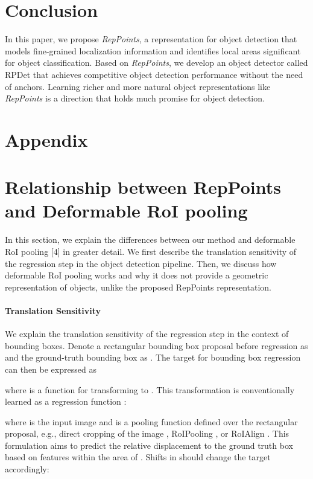 \documentclass[10pt,twocolumn,letterpaper]{article}
\begin{document}
 \vspace{-.5em}
\section{Conclusion}
In this paper, we propose \textit{RepPoints}, a representation for object detection that models fine-grained localization information and identifies local areas significant for object classification. Based on \textit{RepPoints}, we develop an object detector called RPDet that achieves competitive object detection performance without the need of anchors. Learning richer and more natural object representations like \textit{RepPoints} is a direction that holds much promise for object detection.
 
{\small


}
\clearpage
\section*{Appendix}
\appendix
\renewcommand{\thesection}{A\arabic{section}}  

\section{Relationship between RepPoints and Deformable RoI pooling}
In this section, we explain the differences between our method and deformable RoI pooling [4] in greater detail. We first describe the translation sensitivity of the regression step in the object detection pipeline. Then, we discuss how deformable RoI pooling \cite{DCN} works and why it does not provide a geometric representation of objects, unlike the proposed RepPoints representation.

\paragraph{Translation Sensitivity}
We explain the translation sensitivity of the regression step in the context of bounding boxes. Denote a rectangular bounding box proposal before regression as  and the ground-truth bounding box as . The target for bounding box regression can then be expressed as

where  is a function for transforming  to . This transformation is conventionally learned as a regression function :

where  is the input image and  is a pooling function defined over the rectangular proposal, e.g., direct cropping of the image \cite{girshick2014rich}, RoIPooling \cite{ren2015faster}, or RoIAlign \cite{Mask-rcnn}. This formulation aims to predict the relative displacement to the ground truth box based on features within the area of . Shifts in  should change the target accordingly:
\end{document}
